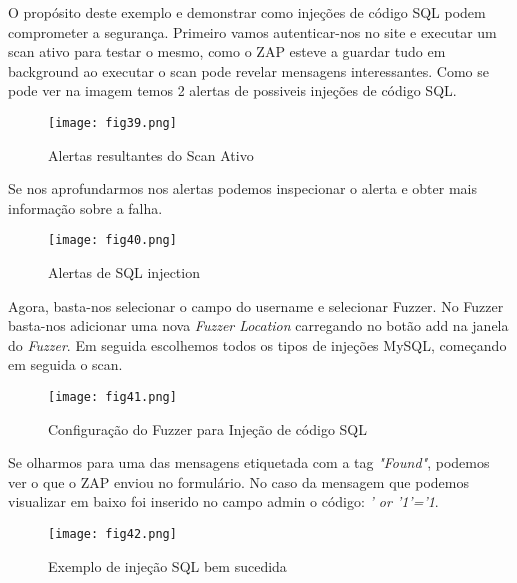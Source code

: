 O propósito deste exemplo e demonstrar como injeções de código SQL podem comprometer a segurança. Primeiro vamos autenticar-nos no site e executar um scan ativo para testar o mesmo, como o ZAP esteve a guardar tudo em background ao executar o scan pode revelar mensagens interessantes. Como se pode ver na imagem temos 2 alertas de possiveis injeções de código SQL.




\begin{figure}[H]

  \centering

  \texttt{[image: fig39.png]}

  \caption{Alertas resultantes do Scan Ativo}

\end{figure}

Se nos aprofundarmos nos alertas podemos inspecionar o alerta e obter mais informação sobre a falha.


\begin{figure}[H]

  \centering

  \texttt{[image: fig40.png]}

  \caption{Alertas de SQL injection}

\end{figure}


Agora, basta-nos selecionar o campo do username e selecionar Fuzzer. No Fuzzer basta-nos adicionar uma nova \textit{Fuzzer Location} carregando no botão add na janela do \textit{Fuzzer}. Em seguida escolhemos todos os tipos de injeções MySQL, começando em seguida o scan. 


\begin{figure}[H]

  \centering

  \texttt{[image: fig41.png]}

  \caption{Configuração do Fuzzer para Injeção de código SQL}

\end{figure}



Se olharmos para uma das mensagens etiquetada com a tag \textit{"Found"}, podemos ver o que o ZAP enviou no formulário. No caso da mensagem que podemos visualizar em baixo foi inserido no campo admin o código: \textit{' or '1'='1}.

\begin{figure}[H]

  \centering

  \texttt{[image: fig42.png]}

  \caption{Exemplo de injeção SQL bem sucedida}

\end{figure}

